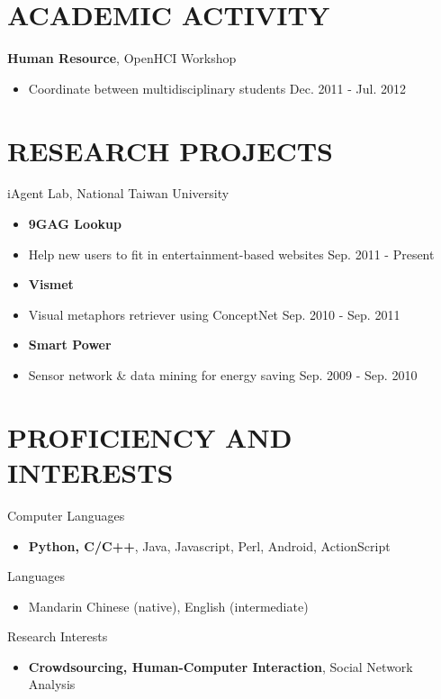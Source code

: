 \documentclass[margin]{main}
\begin{document}
\begin{resume}
\section{ACADEMIC ACTIVITY}
{\bf Human Resource}, OpenHCI Workshop
\begin{itemize} \itemsep -2pt
    \item[] Coordinate between multidisciplinary students \hfill Dec. 2011 - Jul. 2012
\end{itemize}

\section{RESEARCH PROJECTS}
iAgent Lab, National Taiwan University
\begin{itemize} \itemsep -2pt
    \item[] {\bf 9GAG Lookup}
    \item[] Help new users to fit in entertainment-based websites \hfill Sep. 2011 - Present
    \item[] {\bf Vismet}
    \item[] Visual metaphors retriever using ConceptNet \hfill Sep. 2010 - Sep. 2011
    \item[] {\bf Smart Power}
    \item[] Sensor network \& data mining for energy saving \hfill Sep. 2009 - Sep. 2010
\end{itemize}

\section{PROFICIENCY AND INTERESTS}
Computer Languages
\begin{itemize} \itemsep -2pt
    \item[] {\bf Python, C/C++}, Java, Javascript, Perl, Android, ActionScript
\end{itemize}

Languages
\begin{itemize} \itemsep -2pt
    \item[] Mandarin Chinese (native), English (intermediate)
\end{itemize}

Research Interests
\begin{itemize} \itemsep -2pt
    \item[] {\bf Crowdsourcing, Human-Computer Interaction}, Social Network Analysis
\end{itemize}


\end{resume}
\end{document}
